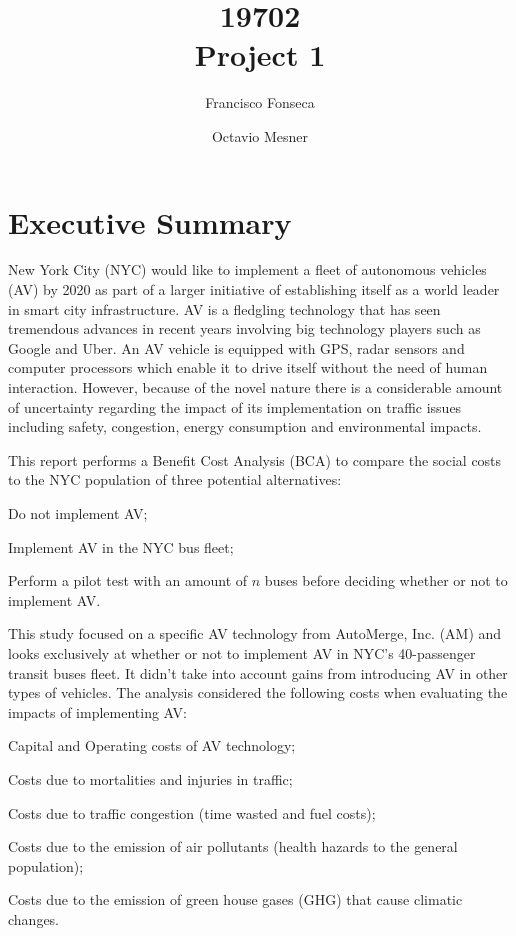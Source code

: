 \documentclass[11pt, letterpaper]{article}
\title{\vspace{-2cm} 19702 \\ Project 1}
\author{Francisco Fonseca \and Octavio Mesner}
\date{\mydate}
\date{\mydateformat\normalsize\mydate} %
\begin{document}

\section*{Executive Summary} \label{execsum}

New York City (NYC) would like to implement a fleet of autonomous
vehicles (AV) by 2020 as part of a larger initiative of establishing
itself as a world leader in smart city infrastructure. AV is a fledgling technology
that has seen tremendous advances in recent years involving
big technology players such as Google and Uber. An AV vehicle is equipped with
GPS, radar sensors and computer processors which enable it to drive itself without the
need of human interaction. However, because of the novel nature there is a considerable amount of
uncertainty regarding the impact of its implementation on traffic
issues including safety, congestion, energy consumption and environmental impacts. 

This report performs a Benefit Cost Analysis (BCA) to compare the social costs to the NYC population of three potential alternatives:
\begin{enumerate*}[label={(\arabic*)},font={\bfseries}]
\item Do not implement AV;
\item Implement AV in the NYC bus fleet;
\item Perform a pilot test with an amount of $n$ buses before deciding whether or not to implement AV.
\end{enumerate*}

This study focused on a specific AV technology from AutoMerge, Inc. (AM) and looks exclusively
at whether or not to implement AV in NYC's 40-passenger transit buses fleet. It didn't take into account
gains from introducing AV in other types of vehicles. The analysis considered the following costs when 
evaluating the impacts of implementing AV:
\begin{enumerate*}[label={(\alph*)},font={\bfseries}]
\item Capital and Operating costs of AV technology;
\item Costs due to mortalities and injuries in traffic;
\item Costs due to traffic congestion (time wasted and fuel costs);
\item Costs due to the emission of air pollutants (health hazards to the general population);
\item Costs due to the emission of green house gases (GHG) that cause climatic changes.
\end{enumerate*}
\end{document}

